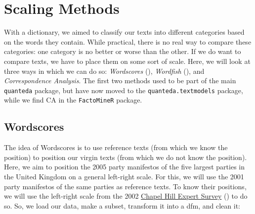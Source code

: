 \documentclass[
]{book}
\begin{document}
\chapter{Scaling Methods}\label{scaling}

With a dictionary, we aimed to classify our texts into different categories based on the words they contain. While practical, there is no real way to compare these categories: one category is no better or worse than the other. If we do want to compare texts, we have to place them on some sort of scale. Here, we will look at three ways in which we can do so: \emph{Wordscores} (), \emph{Wordfish} (), and \emph{Correspondence Analysis}. The first two methods used to be part of the main \texttt{quanteda} package, but have now moved to the \texttt{quanteda.textmodels} package, while we find CA in the \texttt{FactoMineR} package.

\section{Wordscores}\label{wordscores}

The idea of Wordscores is to use reference texts (from which we know the position) to position our virgin texts (from which we do not know the position). Here, we aim to position the 2005 party manifestos of the five largest parties in the United Kingdom on a general left-right scale. For this, we will use the 2001 party manifestos of the same parties as reference texts. To know their positions, we will use the left-right scale from the 2002 \href{https://www.chesdata.eu/}{Chapel Hill Expert Survey} () to do so. So, we load our data, make a subset, transform it into a dfm, and clean it:
\end{document}
